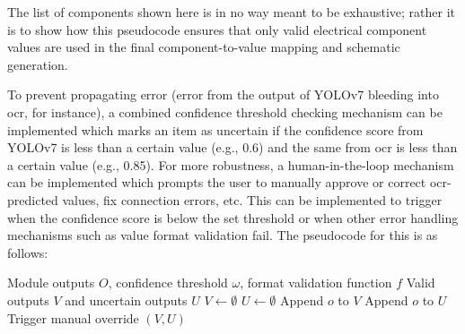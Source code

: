 The list of components shown here is in no way meant to be exhaustive; rather it is to show how this pseudocode ensures that only valid electrical component values are used in the final component-to-value mapping and schematic generation.

To prevent propagating error (error from the output of YOLOv7 bleeding into \gls{ocr}, for instance), a combined confidence threshold checking mechanism can be implemented which marks an item as uncertain if the confidence score from YOLOv7 is less than a certain value (e.g., 0.6) and the same from \gls{ocr} is less than a certain value (e.g., 0.85). For more robustness, a human-in-the-loop mechanism can be implemented which prompts the user to manually approve or correct \gls{ocr}-predicted values, fix connection errors, etc. This can be implemented to trigger when the confidence score is below the set threshold or when other error handling mechanisms such as value format validation fail. The pseudocode for this is as follows:

\begin{algorithm}
\caption{Confidence-Based Error Checking and Validation}
\label{algo:confidence-validation}
\begin{algorithmic}
\Require Module outputs $O$, confidence threshold $\omega$, format validation function $f$
\Ensure Valid outputs $V$ and uncertain outputs $U$
\State $V \leftarrow \emptyset$
\State $U \leftarrow \emptyset$
        \State Append $o$ to $V$
    \Else
        \State Append $o$ to $U$
    \EndIf
\EndFor
{}
    \State Trigger manual override
\EndIf
\State \Return $(V, U)$
\end{algorithmic}
\end{algorithm}
